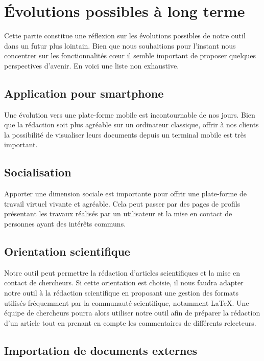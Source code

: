 \documentclass[10pt,twocolumn,a4paper,utf8x]{article}
\begin{document}
\section{Évolutions possibles à long terme}

Cette partie constitue une réflexion sur les évolutions possibles de
notre outil dans un futur plus lointain. Bien que nous souhaitions pour
l'instant nous concentrer sur les fonctionnalités cœur il semble
important de proposer quelques perspectives d'avenir. En voici une liste
non exhaustive.

\subsection{Application pour smartphone}

Une évolution vers une plate-forme mobile est incontournable de nos
jours. Bien que la rédaction soit plus agréable sur un ordinateur
classique, offrir à nos clients la possibilité de visualiser leurs
documents depuis un terminal mobile est très important.

\subsection{Socialisation}

Apporter une dimension sociale est importante pour offrir une
plate-forme de travail virtuel vivante et agréable. Cela peut passer par
des pages de profils présentant les travaux réalisés par un utilisateur
et la mise en contact de personnes ayant des intérêts communs.

\subsection{Orientation scientifique}

Notre outil peut permettre la rédaction d'articles scientifiques et la
mise en contact de chercheurs. Si cette orientation est choisie, il nous
faudra adapter notre outil à la rédaction scientifique en proposant une
gestion des formats utilisés fréquemment par la communauté scientifique,
notamment LaTeX. Une équipe de chercheurs pourra alors utiliser notre
outil afin de préparer la rédaction d'un article tout en prenant en
compte les commentaires de différents relecteurs.

\subsection{Importation de documents externes}
\end{document}
